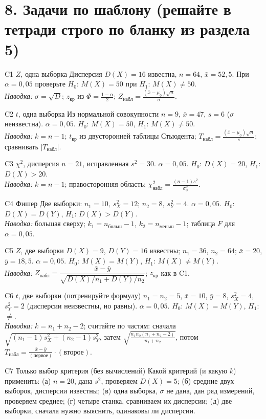 \documentclass[a4paper,11pt]{extarticle}
\newcommand{\kr}{\text{кр}}\newcommand{\nab}{\text{набл}}
\begin{document}
\newpage
\section*{8. Задачи по шаблону (решайте в тетради строго по бланку из раздела 5)}
\begin{task}{C1 \quad $Z$, одна выборка}
Дисперсия $D(X)=16$ известна, $n=64$, $\bar x=52{,}5$. При $\alpha=0{,}05$ проверьте $H_0$: $M(X)=50$ при $H_1$: $M(X)\ne50$.\\
\emph{Наводка:} $\sigma=\sqrt{D}$; $z_\kr$ из $\Phi=\frac{1-\alpha}{2}$; $Z_\nab=\frac{(\bar x-\mu_0)\sqrt n}{\sigma}$.
\end{task}
\begin{task}{C2 \quad $t$, одна выборка}
Из нормальной совокупности $n=9$, $\bar x=47$, $s=6$ ($\sigma$ неизвестна). $\alpha=0{,}05$. $H_0$: $M(X)=50$, $H_1$: $M(X)\ne50$.\\
\emph{Наводка:} $k=n-1$; $t_\kr$ из двусторонней таблицы Стьюдента; $T_\nab=\frac{(\bar x-\mu_0)\sqrt n}{s}$; сравнивать $|T_\nab|$.
\end{task}
\begin{task}{C3 \quad $\chi^2$, дисперсия}
$n=21$, исправленная $s^2=30$. $\alpha=0{,}05$. $H_0$: $D(X)=20$, $H_1$: $D(X)>20$.\\
\emph{Наводка:} $k=n-1$; правосторонняя область; $\chi^2_\nab=\frac{(n-1)s^2}{\sigma_0^2}$.
\end{task}
\begin{task}{C4 \quad Фишер}
Две выборки: $n_1=10,\ s_X^2=12$; $n_2=8,\ s_Y^2=4$. $\alpha=0{,}05$. $H_0$: $D(X)=D(Y)$, $H_1$: $D(X)>D(Y)$.\\
\emph{Наводка:} большая сверху; $k_1=n_{\text{больш}}-1$, $k_2=n_{\text{меньш}}-1$; таблица $F$ для $\alpha=0{,}05$.
\end{task}
\begin{task}{C5 \quad $Z$, две выборки}
$D(X)=9$, $D(Y)=16$ известны; $n_1=36$, $n_2=64$; $\bar x=20$, $\bar y=18{,}5$. $\alpha=0{,}05$. $H_0$: $M(X)=M(Y)$, $H_1$: $M(X)\ne M(Y)$.\\
\emph{Наводка:} $Z_\nab=\dfrac{\bar x-\bar y}{\sqrt{D(X)/n_1+D(Y)/n_2}}$; $z_\kr$ как в C1.
\end{task}
\begin{task}{C6 \quad $t$, две выборки (потренируйте формулу)}
$n_1=n_2=5$, $\bar x=10$, $\bar y=8$, $s_X^2=4$, $s_Y^2=2$ (дисперсии неизвестны, но равны). $\alpha=0{,}05$. $H_0$: $M(X)=M(Y)$, $H_1$: $\ne$.\\
\emph{Наводка:} $k=n_1+n_2-2$; считайте по частям: сначала $\sqrt{(n_1-1)s_X^2+(n_2-1)s_Y^2}$, затем $\sqrt{\frac{n_1n_2(n_1+n_2-2)}{n_1+n_2}}$, потом $T_\nab=\frac{\bar x-\bar y}{(\text{первое})}\cdot(\text{второе})$.
\end{task}
\begin{task}{C7 \quad Только выбор критерия (без вычислений)}
Какой критерий (и какую $k$) применить: (а) $n=20$, дана $s^2$, проверяем $D(X)=5$; (б) средние двух выборок, дисперсии известны; (в) одна выборка, $\sigma$ не дана, дан ряд измерений, проверяем среднее; (г) четыре станка, сравниваем их дисперсии; (д) две выборки, сначала нужно выяснить, одинаковы ли дисперсии.
\end{task}
\end{document}
